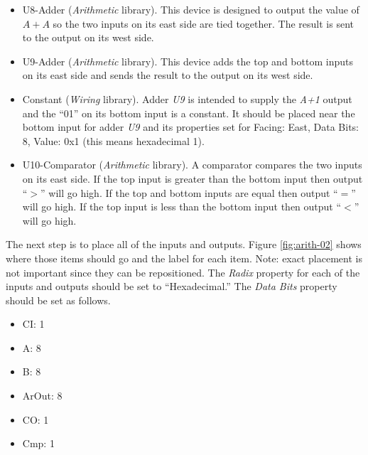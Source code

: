 \begin{itemize}
	\item U8-Adder (\textit{Arithmetic} library). This device is designed to output the value of $ A+A $ so the two inputs on its east side are tied together. The result is sent to the output on its west side.
	\item U9-Adder (\textit{Arithmetic} library). This device adds the top and bottom inputs on its east side and sends the result to the output on its west side.
	\item Constant (\textit{Wiring} library). Adder \textit{U9} is intended to supply the \textit{A+1} output and the ``01'' on its bottom input is a constant. It should be placed near the bottom input for adder \textit{U9} and its properties set for Facing: East, Data Bits: 8, Value: 0x1 (this means hexadecimal 1).	
	\item U10-Comparator (\textit{Arithmetic} library). A comparator compares the two inputs on its east side. If the top input is greater than the bottom input then output ``$ > $'' will go high. If the top and bottom inputs are equal then output ``$ = $'' will go high. If the top input is less than the bottom input then output ``$ < $'' will go high.
\end{itemize}

The next step is to place all of the inputs and outputs. Figure \ref{fig:arith-02} shows where those items should go and the label for each item. Note: exact placement is not important since they can be repositioned. The \textit{Radix} property for each of the inputs and outputs should be set to ``Hexadecimal.'' The \textit{Data Bits} property should be set as follows.

\begin{itemize}
	\item CI: 1
	\item A: 8
	\item B: 8
	\item ArOut: 8
	\item CO: 1
	\item Cmp: 1
\end{itemize}

